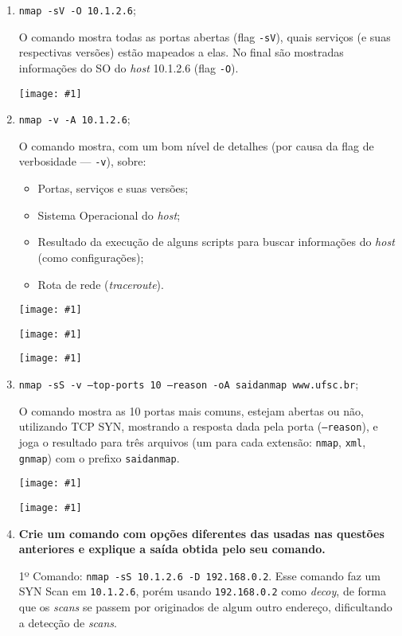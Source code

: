 \documentclass{article}
\newcommand{\code}[1]{\texttt{#1}}
\newcommand{\img}[1]{%
    \texttt{[image: \#1]}
}
\begin{document}
    \begin{enumerate}
        \item \texttt{nmap -sV -O 10.1.2.6};

            O comando mostra todas as portas abertas (flag \code{-sV}), quais
            serviços (e suas respectivas versões) estão mapeados a elas. No
            final são mostradas informações do SO do \textit{host} 10.1.2.6
            (flag \code{-O}).

            \img{imgs/q1_1}

        \item \texttt{nmap -v -A 10.1.2.6};

            O comando mostra, com um bom nível de detalhes (por causa da flag
            de verbosidade --- \code{-v}), sobre:
            \begin{itemize}
                \item Portas, serviços e suas versões;
                \item Sistema Operacional do \textit{host};
                \item Resultado da execução de alguns scripts para buscar
                    informações do \textit{host} (como configurações);
                \item Rota de rede (\textit{traceroute}).
            \end{itemize}

            \img{imgs/q1_2_1}
            \img{imgs/q1_2_2}
            \img{imgs/q1_2_3}

        \item \texttt{nmap -sS -v --top-ports 10 --reason -oA saidanmap
            www.ufsc.br};

            O comando mostra as 10 portas mais comuns, estejam abertas ou não,
            utilizando TCP SYN, mostrando a resposta dada pela porta
            (\code{--reason}), e joga o resultado para três arquivos (um para
            cada extensão: \code{nmap}, \code{xml}, \code{gnmap}) com o prefixo
            \code{saidanmap}.

            \img{imgs/q1_3_1}
            \img{imgs/q1_3_2}

        \item \textbf{Crie um comando com opções diferentes das usadas nas
                questões anteriores e explique a saída obtida pelo seu
                comando.}

            1º Comando: \code{nmap -sS 10.1.2.6 -D 192.168.0.2}. Esse comando
            faz um SYN Scan em \code{10.1.2.6}, porém usando \code{192.168.0.2}
            como \textit{decoy}, de forma que os \textit{scans} se passem por
            originados de algum outro endereço, dificultando a detecção de
            \textit{scans}.


\end{enumerate}
\end{document}
